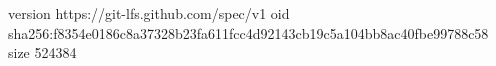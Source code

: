 version https://git-lfs.github.com/spec/v1
oid sha256:f8354e0186c8a37328b23fa611fcc4d92143cb19c5a104bb8ac40fbe99788c58
size 524384

